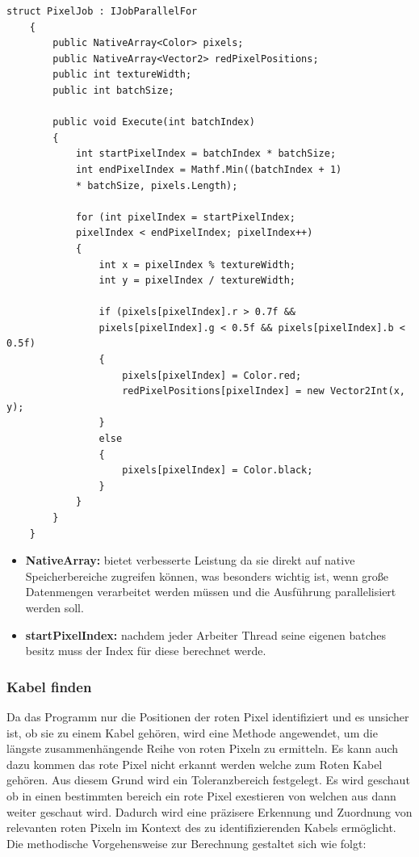\begin{lstlisting}[style=csharp, caption={Rote pixel suche}, label=code:PixelJob]
    struct PixelJob : IJobParallelFor
    {
        public NativeArray<Color> pixels;
        public NativeArray<Vector2> redPixelPositions;
        public int textureWidth;
        public int batchSize;

        public void Execute(int batchIndex)
        {
            int startPixelIndex = batchIndex * batchSize;
            int endPixelIndex = Mathf.Min((batchIndex + 1)
            * batchSize, pixels.Length);

            for (int pixelIndex = startPixelIndex;
            pixelIndex < endPixelIndex; pixelIndex++)
            {
                int x = pixelIndex % textureWidth;
                int y = pixelIndex / textureWidth;

                if (pixels[pixelIndex].r > 0.7f &&
                pixels[pixelIndex].g < 0.5f && pixels[pixelIndex].b < 0.5f)
                {
                    pixels[pixelIndex] = Color.red;
                    redPixelPositions[pixelIndex] = new Vector2Int(x, y);
                }
                else
                {
                    pixels[pixelIndex] = Color.black;
                }
            }
        }
    }
\end{lstlisting}
\begin{itemize}
    \item \textbf{NativeArray:} bietet verbesserte Leistung da sie direkt auf native Speicherbereiche zugreifen können,
    was besonders wichtig ist, wenn große Datenmengen verarbeitet werden müssen und die Ausführung parallelisiert
    werden soll.
    \item \textbf{startPixelIndex:} nachdem jeder Arbeiter Thread seine eigenen batches besitz muss der Index für diese
    berechnet werde.
\end{itemize}


\subsubsection{Kabel finden}
Da das Programm nur die Positionen der roten Pixel identifiziert und es unsicher ist, ob sie zu einem Kabel gehören,
wird eine Methode angewendet, um die längste zusammenhängende Reihe von roten Pixeln zu ermitteln. Es kann auch dazu
kommen das rote Pixel nicht erkannt werden welche zum Roten Kabel gehören. Aus diesem Grund wird ein Toleranzbereich
festgelegt. Es wird geschaut ob in einen bestimmten bereich ein rote Pixel exestieren von welchen aus dann weiter
geschaut wird. Dadurch wird eine präzisere Erkennung und Zuordnung von relevanten roten Pixeln im Kontext des zu
identifizierenden Kabels ermöglicht. Die methodische Vorgehensweise zur Berechnung gestaltet sich wie folgt:


